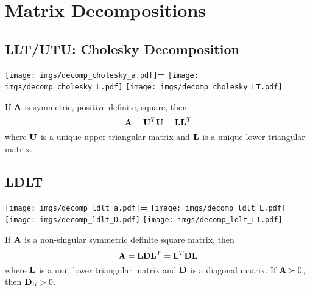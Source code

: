 \chapter{Matrix Decompositions}

\section{LLT/UTU: Cholesky Decomposition} %

\begin{center}
\texttt{[image: imgs/decomp\_cholesky\_a.pdf]}\textbf{\large =}
\texttt{[image: imgs/decomp\_cholesky\_L.pdf]}\textbf{\large *}
\texttt{[image: imgs/decomp\_cholesky\_LT.pdf]}
\end{center}

If $\mathbf{A}$ is symmetric, positive definite, square, then
\begin{equation}
\mathbf{A}=\mathbf{U}^T\mathbf{U}=\mathbf{L}\mathbf{L}^T
\end{equation}
where $\mathbf{U}$ is a unique upper triangular matrix and $\mathbf{L}$ is a unique lower-triangular matrix.

\section{LDLT}

\begin{center}
\texttt{[image: imgs/decomp\_ldlt\_a.pdf]}\textbf{\large =}
\texttt{[image: imgs/decomp\_ldlt\_L.pdf]}\textbf{\large *}
\texttt{[image: imgs/decomp\_ldlt\_D.pdf]}\textbf{\large *}
\texttt{[image: imgs/decomp\_ldlt\_LT.pdf]}
\end{center}

If $\mathbf{A}$ is a non-singular symmetric definite square matrix, then
\begin{equation}
\mathbf{A}=\mathbf{L}\mathbf{D}\mathbf{L}^T=\mathbf{L}^T\mathbf{D}\mathbf{L}
\end{equation}
where $\mathbf{L}$ is a unit lower triangular matrix and $\mathbf{D}$ is a diagonal matrix. If $\mathbf{A}\succ0$, then $\mathbf{D}_{ii}>0$.




